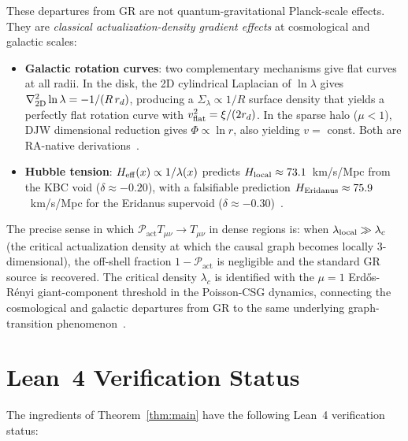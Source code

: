 \documentclass[11pt,a4paper]{article}
\newcommand{\Pact}{\mathcal{P}_{\mathrm{act}}}
\begin{document}
These departures from GR are not quantum-gravitational Planck-scale
effects. They are \emph{classical actualization-density gradient
effects} at cosmological and galactic scales:
\begin{itemize}[noitemsep]
  \item \textbf{Galactic rotation curves}: two complementary
    mechanisms give flat curves at all radii. In the disk, the 2D
    cylindrical Laplacian of $\ln\lambda$ gives $\nabla^2_{\rm 2D}\ln\lambda
    = -1/(R\,r_d)$, producing a $\Sigma_\lambda \propto 1/R$ surface density
    that yields a perfectly flat rotation curve with
    $v_{\rm flat}^2 = \xi/(2r_d)$. In the sparse halo ($\mu < 1$), DJW
    dimensional reduction gives $\Phi \propto \ln r$, also yielding
    $v = $ const. Both are RA-native derivations~\citep{Sandeman2026RADM}.
  \item \textbf{Hubble tension}: $H_{\rm eff}(x) \propto 1/\lambda(x)$
    predicts $H_{\rm local} \approx 73.1$~km/s/Mpc from the KBC void
    ($\delta \approx -0.20$), with a falsifiable prediction
    $H_{\rm Eridanus} \approx 75.9$~km/s/Mpc for the Eridanus
    supervoid ($\delta \approx -0.30$)~\citep{Sandeman2026RAGC}.
\end{itemize}

The precise sense in which $\Pact T_{\mu\nu} \to T_{\mu\nu}$ in
dense regions is: when $\lambda_{\rm local} \gg \lambda_c$ (the
critical actualization density at which the causal graph becomes
locally 3-dimensional), the off-shell fraction $1 - \Pact$ is
negligible and the standard GR source is recovered. The critical
density $\lambda_c$ is identified with the $\mu = 1$
Erd\H{o}s-R\'{e}nyi giant-component threshold in the Poisson-CSG
dynamics, connecting the cosmological and galactic departures from GR
to the same underlying graph-transition
phenomenon~\citep{Sandeman2026RAQI}.

\section{Lean~4 Verification Status}
\label{sec:lean}

The ingredients of Theorem~\ref{thm:main} have the following Lean~4
verification status:
\end{document}
